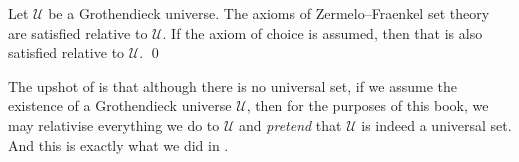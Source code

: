 \begin{theorem}
\label{thmGrothendieckUniversesAreModelOfZFC}
Let $\mathcal{U}$ be a Grothendieck universe. The axioms of Zermelo--Fraenkel set theory are satisfied relative to $\mathcal{U}$. If the axiom of choice is assumed, then that is also satisfied relative to $\mathcal{U}$. \qed
\end{theorem}

The upshot of  is that although there is no universal set, if we assume the existence of a Grothendieck universe $\mathcal{U}$, then for the purposes of this book, we may relativise everything we do to $\mathcal{U}$ and \textit{pretend} that $\mathcal{U}$ is indeed a universal set. And this is exactly what we did in .